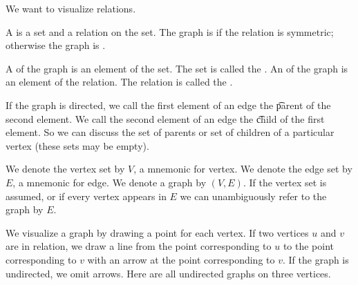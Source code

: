 
\sbasic





\sstart
{}


We want to visualize relations.


A  is a set and a relation
on the set.
The graph is 
if the relation is symmetric; otherwise the
graph is .

A  of the graph is an element
of the set.
The set is called the .
An  of the graph is an element of
the relation.
The relation is called the .

If the graph is directed, we call the first element of an edge the \t{parent} of the second element. We call the second element of an edge the \t{child} of the first element. So we can discuss the set of parents or set of children of a particular vertex (these sets may be empty).



We denote the vertex set by $V$, a mnemonic for
vertex.
We denote the edge set by $E$, a mnemonic for
edge.
We denote a graph by $(V, E)$.
If the vertex set is assumed, or if every vertex appears in $E$  we can unambiguously refer to the graph by $E$.



We visualize a graph by drawing a
point for each vertex.
If two vertices $u$ and $v$ are in relation,
we draw a line from the point corresponding
to $u$ to the point corresponding to $v$ with
an arrow at the point corresponding to $v$.
If the graph is undirected, we omit arrows.
Here are all undirected graphs on three
vertices.


